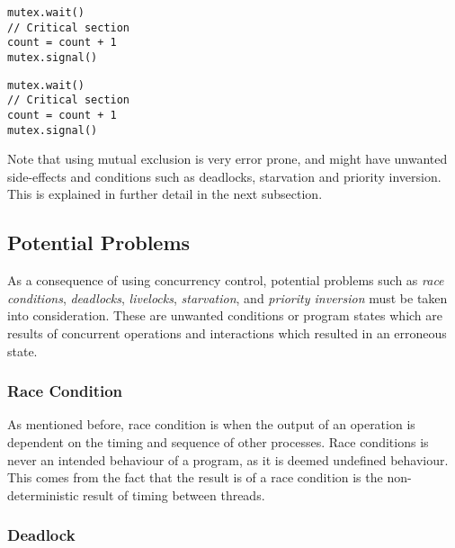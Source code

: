 \noindent\begin{minipage}{0.45\textwidth}
\begin{lstlisting}[title={Process A},style={CustomC},frame={},xleftmargin={4em}]
mutex.wait()
// Critical section
count = count + 1
mutex.signal()
\end{lstlisting}
\end{minipage}
\begin{minipage}{0.45\textwidth}
\begin{lstlisting}[title={Process B},style={CustomC},frame={},xleftmargin={4em}]
mutex.wait()
// Critical section
count = count + 1
mutex.signal()
\end{lstlisting}
\end{minipage}

Note that using mutual exclusion is very error prone, and might have unwanted side\hyp{}effects and conditions such as deadlocks, starvation and priority inversion. This is explained in further detail in the next subsection.


\subsection{Potential Problems}
\label{subsec:potential_problems}

As a consequence of using concurrency control, potential problems such as \textit{race conditions}, \textit{deadlocks}, \textit{livelocks}, \textit{starvation}, and \textit{priority inversion} must be taken into consideration. These are unwanted conditions or program states which are results of concurrent operations and interactions which resulted in an erroneous state.


\subsubsection{Race Condition}

As mentioned before, race condition is when the output of an operation is dependent on the timing and sequence of other processes. Race conditions is never an intended behaviour of a program, as it is deemed undefined behaviour. This comes from the fact that the result is of a race condition is the non\hyp{}deterministic result of timing between threads. 


\subsubsection{Deadlock}

